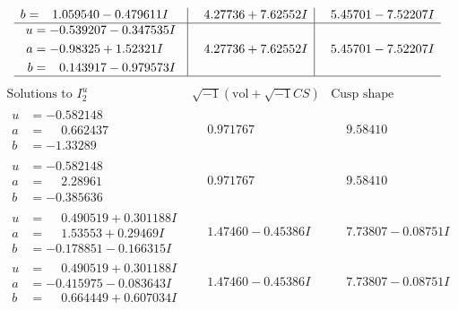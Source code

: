 \documentclass[1p]{elsarticle_modified}
\theoremstyle{definition}
\newcommand{\I}{\sqrt{-1}}
\begin{document}
$$\begin{array}{c|c|c}
\begin{aligned}
b &= \phantom{-}1.059540 - 0.479611 I\end{aligned}
 & \phantom{-}4.27736 + 7.62552 I & \phantom{-}5.45701 - 7.52207 I \\ \hline\begin{aligned}
u &= -0.539207 - 0.347535 I \\
a &= -0.98325 + 1.52321 I \\
b &= \phantom{-}0.143917 - 0.979573 I\end{aligned}
 & \phantom{-}4.27736 + 7.62552 I & \phantom{-}5.45701 - 7.52207 I\\
 \hline 
 \end{array}$$\newpage$$\begin{array}{c|c|c}  
\text{Solutions to }I^u_{2}& \I (\text{vol} + \sqrt{-1}CS) & \text{Cusp shape}\\
 \hline 
\begin{aligned}
u &= -0.582148\phantom{ +0.000000I} \\
a &= \phantom{-}0.662437\phantom{ +0.000000I} \\
b &= -1.33289\phantom{ +0.000000I}\end{aligned}
 & \phantom{-}0.971767\phantom{ +0.000000I} & \phantom{-}9.58410\phantom{ +0.000000I} \\ \hline\begin{aligned}
u &= -0.582148\phantom{ +0.000000I} \\
a &= \phantom{-}2.28961\phantom{ +0.000000I} \\
b &= -0.385636\phantom{ +0.000000I}\end{aligned}
 & \phantom{-}0.971767\phantom{ +0.000000I} & \phantom{-}9.58410\phantom{ +0.000000I} \\ \hline\begin{aligned}
u &= \phantom{-}0.490519 + 0.301188 I \\
a &= \phantom{-}1.53553 + 0.29469 I \\
b &= -0.178851 - 0.166315 I\end{aligned}
 & \phantom{-}1.47460 - 0.45386 I & \phantom{-}7.73807 - 0.08751 I \\ \hline\begin{aligned}
u &= \phantom{-}0.490519 + 0.301188 I \\
a &= -0.415975 - 0.083643 I \\
b &= \phantom{-}0.664449 + 0.607034 I\end{aligned}
 & \phantom{-}1.47460 - 0.45386 I & \phantom{-}7.73807 - 0.08751 I \\ \hline\begin{aligned}

\end{aligned}
\end{array}$$
\end{document}
